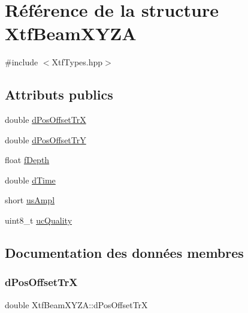 \hypertarget{structXtfBeamXYZA}{}\section{Référence de la structure Xtf\+Beam\+X\+Y\+ZA}
\label{structXtfBeamXYZA}


{\ttfamily \#include $<$Xtf\+Types.\+hpp$>$}

\subsection*{Attributs publics}
\begin{DoxyCompactItemize}
\item 
double \hyperlink{structXtfBeamXYZA_ad312d13d5f31628658eef6013a9871d7}{d\+Pos\+Offset\+TrX}
\item 
double \hyperlink{structXtfBeamXYZA_a781a9fcc382d276f8ea7f58b2e5c2331}{d\+Pos\+Offset\+TrY}
\item 
float \hyperlink{structXtfBeamXYZA_a3dab3d8e0e760a39c42d6180b136a38a}{f\+Depth}
\item 
double \hyperlink{structXtfBeamXYZA_a9023068b34ca1ef06aea47a38a96ef5e}{d\+Time}
\item 
short \hyperlink{structXtfBeamXYZA_a42b84ad0c8ca312979b22999f65391ab}{us\+Ampl}
\item 
uint8\+\_\+t \hyperlink{structXtfBeamXYZA_a0a54860def9608dd1511ca338e02bc96}{uc\+Quality}
\end{DoxyCompactItemize}


\subsection{Documentation des données membres}
\mbox{\label{structXtfBeamXYZA_ad312d13d5f31628658eef6013a9871d7}} 
\subsubsection{\texorpdfstring{d\+Pos\+Offset\+TrX}{dPosOffsetTrX}}
{\footnotesize\ttfamily double Xtf\+Beam\+X\+Y\+Z\+A\+::d\+Pos\+Offset\+TrX}

\mbox{\label{structXtfBeamXYZA_a781a9fcc382d276f8ea7f58b2e5c2331}} 
